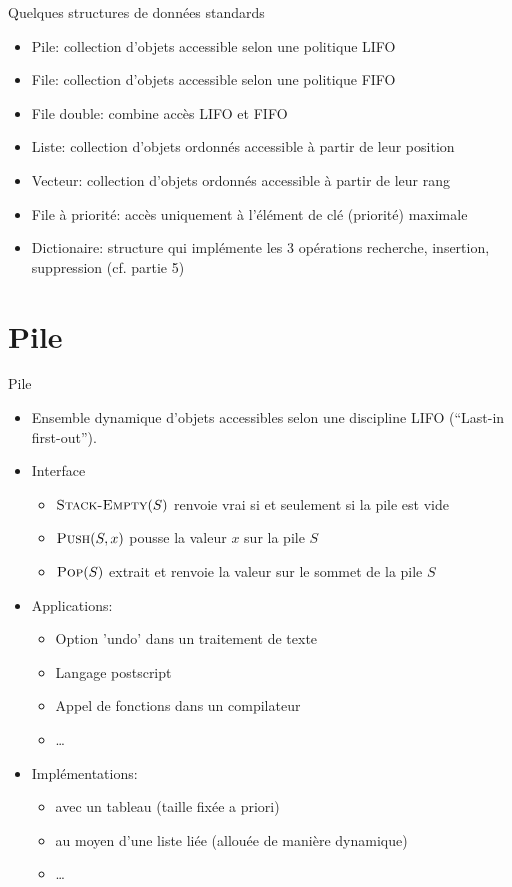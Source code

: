 \begin{frame}{Quelques structures de données standards}

\begin{itemize}
\item Pile: collection d'objets accessible selon une politique LIFO
\item File: collection d'objets accessible selon une politique FIFO
\item File double: combine accès LIFO et FIFO
\item Liste: collection d'objets ordonnés accessible à partir de leur position
\item Vecteur: collection d'objets ordonnés accessible à partir de leur rang
\item File à priorité: accès uniquement à l'élément de clé (priorité) maximale

\bigskip

\item Dictionaire: structure qui implémente les 3 opérations
  recherche, insertion, suppression (cf. partie 5)
\end{itemize}

\end{frame}

\section{Pile}

\begin{frame}{Pile}
\begin{itemize}
\item Ensemble dynamique d'objets accessibles selon une discipline
  \alert{LIFO} (``Last-in first-out'').
\item Interface
\begin{itemize}
\item $\textnormal{\scshape Stack-Empty}(S)$ renvoie vrai si et seulement si la pile est vide
\item $\textnormal{\scshape Push}(S,x)$ pousse la valeur $x$ sur la pile $S$
\item $\textnormal{\scshape Pop}(S)$ extrait et renvoie la valeur sur le sommet de la pile $S$
\end{itemize}
\item Applications:
\begin{itemize}
\item Option 'undo' dans un traitement de texte
\item Langage postscript
\item Appel de fonctions dans un compilateur
\item \ldots
\end{itemize}
\item Implémentations:
\begin{itemize}
\item avec un tableau (taille fixée a priori)
\item au moyen d'une liste liée (allouée de manière dynamique)
\item \ldots
\end{itemize}
\end{itemize}
\end{frame}

